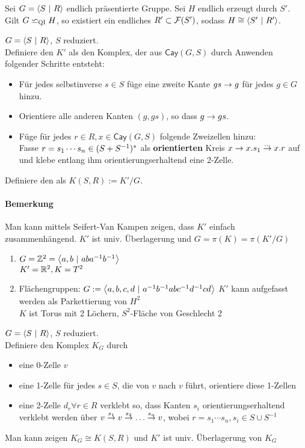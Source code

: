 \documentclass{article}
\newcommand{\qi}{\backsimeq_{\textsc{QI}}}
\newcommand{\tm}{\subset}
\newcommand{\Cay}[2]{\textsf{Cay}(#1,#2)}
\begin{document}
Sei $G = \grp{S}{R}$ endlich präsentierte Gruppe. Sei $H$ endlich erzeugt durch $S'$.\\
Gilt $G \qi H$, so existiert ein endliches $R' \tm \F(S')$, sodass $H \isom{} \grp{S'}{R'}$.

$G = \grp{S}{R}$, $S$ reduziert.\\
Definiere den  $K'$ als den Komplex, der aus $\Cay{G}{S}$ durch Anwenden folgender Schritte entsteht:
\begin{itemize}
\item Für jedes selbstinverse $s\in S$ füge eine zweite Kante $gs \overset{}{\rightarrow} g$ für jedes $g \in G$ hinzu.
\item Orientiere alle anderen Kanten $(g, gs)$, so dass $g \overset{}{\rightarrow} gs$.
\item Füge für jedes $r \in R, x \in \Cay{G}{S}$ folgende Zweizellen hinzu:\\
Fasse $r = s_1\cdots s_n \in (S + S^{-1})^*$ als \textbf{orientierten} Kreis $x \overset{}{\rightarrow} x.s_1 \overset{\ldots}{\rightarrow} x.r$ auf und klebe entlang ihm orientierungserhaltend eine 2-Zelle.
\end{itemize}
Definiere den  als $K(S,R) := K' / G$.

\paragraph{Bemerkung}
Man kann mittels Seifert-Van Kampen zeigen, dass $K'$ einfach zusammenhängend. $K'$ ist univ. Überlagerung und $G = \pi(K) = \pi(K'/G)$


\begin{enumerate}
	\item $G = \Z^2 = \grp{a,b}{aba^{-1}b^{-1}}$\\
		$K' = \mathbb{R}^2, K = T^2$
	\item Flächengruppen: $G:=\grp{a,b,c,d}{a^{-1}b^{-1}abc^{-1}d^{-1}cd }$
	$K'$ kann aufgefasst werden als Parkettierung von $H^2$\\
	$K$ ist Torus mit 2 Löchern, $S^2$-Fläche von Geschlecht 2
\end{enumerate}

$G = \grp{S}{R}$, $S$ reduziert.\\
Definiere den Komplex $K_G$ durch
\begin{itemize}
	\item eine 0-Zelle $v$
	\item eine 1-Zelle für jedes $s \in S$, die von $v$ nach $v$ führt, orientiere diese 1-Zellen
	\item eine 2-Zelle $d_r \forall r \in R$ verklebt so, dass Kanten $s_i$ orientierungserhaltend verklebt werden über $v \overset{s_1}{\rightarrow}  v \overset{s_2}{\rightarrow}  \ldots \overset{s_n}{\rightarrow} v$, wobei $r = s_1\cdots s_n, s_i \in S\cup S^{-1}$
\end{itemize}
Man kann zeigen $K_G \cong K(S,R)$ und $K'$ ist univ. Überlagerung von $K_G$
\end{document}
